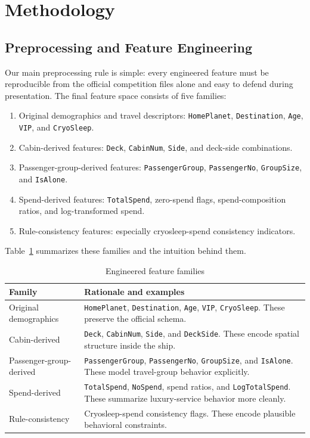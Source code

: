 \documentclass[conference]{IEEEtran}
\begin{document}
\section{Methodology}
\subsection{Preprocessing and Feature Engineering}
Our main preprocessing rule is simple: every engineered feature must be reproducible from the official competition files alone and easy to defend during presentation. The final feature space consists of five families:
\begin{enumerate}
\item Original demographics and travel descriptors: \texttt{HomePlanet}, \texttt{Destination}, \texttt{Age}, \texttt{VIP}, and \texttt{CryoSleep}.
\item Cabin-derived features: \texttt{Deck}, \texttt{CabinNum}, \texttt{Side}, and deck-side combinations.
\item Passenger-group-derived features: \texttt{PassengerGroup}, \texttt{PassengerNo}, \texttt{GroupSize}, and \texttt{IsAlone}.
\item Spend-derived features: \texttt{TotalSpend}, zero-spend flags, spend-composition ratios, and log-transformed spend.
\item Rule-consistency features: especially cryosleep-spend consistency indicators.
\end{enumerate}

Table~\ref{tab:feature-families} summarizes these families and the intuition behind them.

\begin{table}[!t]
\caption{Engineered feature families}
\label{tab:feature-families}
\centering
\scriptsize
\begin{tabularx}{\columnwidth}{>{\raggedright\arraybackslash}p{}X}
\toprule
Family & Rationale and examples \\
\midrule
Original demographics & \texttt{HomePlanet}, \texttt{Destination}, \texttt{Age}, \texttt{VIP}, \texttt{CryoSleep}. These preserve the official schema. \\
Cabin-derived & \texttt{Deck}, \texttt{CabinNum}, \texttt{Side}, and \texttt{DeckSide}. These encode spatial structure inside the ship. \\
Passenger-group-derived & \texttt{PassengerGroup}, \texttt{PassengerNo}, \texttt{GroupSize}, and \texttt{IsAlone}. These model travel-group behavior explicitly. \\
Spend-derived & \texttt{TotalSpend}, \texttt{NoSpend}, spend ratios, and \texttt{LogTotalSpend}. These summarize luxury-service behavior more cleanly. \\
Rule-consistency & Cryosleep-spend consistency flags. These encode plausible behavioral constraints. \\
\bottomrule
\end{tabularx}
\end{table}
\end{document}
